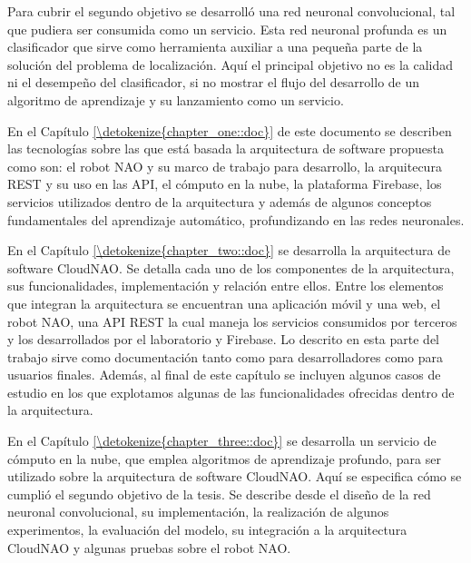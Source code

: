 Para cubrir el segundo objetivo se desarrolló 
una red neuronal convolucional, tal que pudiera ser consumida
como un servicio. Esta red neuronal profunda es un clasificador
que sirve como herramienta auxiliar a una pequeña parte de la solución del 
problema de localización. Aquí el principal objetivo
no es la calidad ni el desempeño del clasificador,
si no mostrar el flujo del desarrollo de un algoritmo
de aprendizaje y su lanzamiento como un servicio.

En el Capítulo \ref{\detokenize{chapter_one::doc}} de este 
documento se describen las tecnologías sobre las que está
basada la arquitectura de software propuesta como son: el robot
NAO y su marco de trabajo para desarrollo, la arquitecura REST y 
su uso en las API, el cómputo en la nube, la plataforma Firebase, los servicios utilizados dentro de la arquitectura y además de 
algunos conceptos fundamentales del aprendizaje automático,
profundizando en las redes neuronales.

En el Capítulo \ref{\detokenize{chapter_two::doc}} se 
desarrolla la arquitectura de software
CloudNAO. Se
detalla cada uno de los componentes de la arquitectura,
sus funcionalidades, implementación y relación
entre ellos.
Entre los elementos que integran la arquitectura se encuentran una aplicación móvil y una web, el robot NAO,
una API REST la cual maneja los servicios consumidos
por terceros y los desarrollados por el laboratorio
y Firebase.
Lo descrito
en esta parte del trabajo sirve 
como documentación tanto como para desarrolladores como
para usuarios finales. Además, al final de este capítulo
se incluyen algunos casos de estudio en los que
explotamos algunas de las funcionalidades 
ofrecidas dentro de la arquitectura.


En el Capítulo \ref{\detokenize{chapter_three::doc}} se 
desarrolla un servicio de cómputo en la nube,
que emplea algoritmos de aprendizaje profundo, para ser 
utilizado sobre la arquitectura de software CloudNAO.
Aquí se especifica cómo se cumplió el segundo
objetivo de la tesis. Se describe desde el diseño de
la red neuronal convolucional, su implementación, 
la realización de algunos experimentos, la evaluación
del modelo, su integración a la arquitectura CloudNAO
y algunas pruebas sobre el robot NAO.
